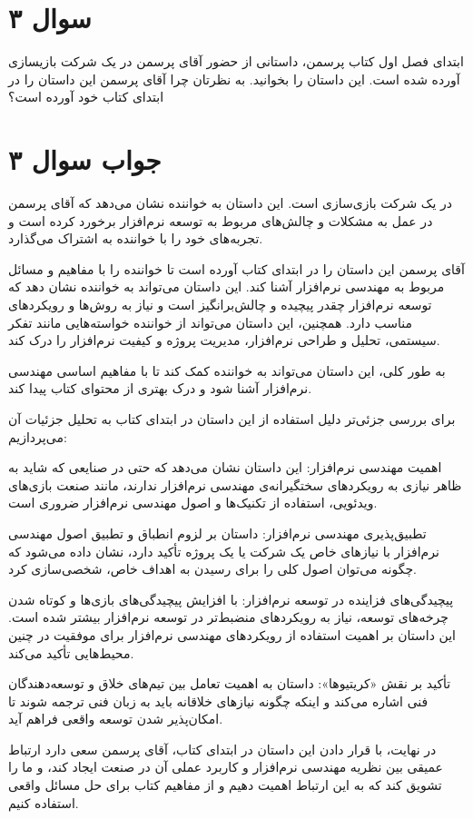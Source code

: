 \section*{سوال ۳}

ابتدای فصل اول کتاب پرسمن، داستانی از حضور آقای پرسمن در یک شرکت بازیسازی آورده شده است. این داستان را بخوانید. به نظرتان چرا آقای پرسمن این داستان را در ابتدای کتاب خود آورده است؟

\section*{جواب سوال ۳}

در یک شرکت بازی‌سازی است. این داستان به خواننده نشان می‌دهد که آقای پرسمن در عمل به مشکلات و چالش‌های مربوط به توسعه نرم‌افزار برخورد کرده است و تجربه‌های خود را با خواننده به اشتراک می‌گذارد.

آقای پرسمن این داستان را در ابتدای کتاب آورده است تا خواننده را با مفاهیم و مسائل مربوط به مهندسی نرم‌افزار آشنا کند. این داستان می‌تواند به خواننده نشان دهد که توسعه نرم‌افزار چقدر پیچیده و چالش‌برانگیز است و نیاز به روش‌ها و رویکردهای مناسب دارد. همچنین، این داستان می‌تواند از خواننده خواسته‌هایی مانند تفکر سیستمی، تحلیل و طراحی نرم‌افزار، مدیریت پروژه و کیفیت نرم‌افزار را درک کند.

به طور کلی، این داستان می‌تواند به خواننده کمک کند تا با مفاهیم اساسی مهندسی نرم‌افزار آشنا شود و درک بهتری از محتوای کتاب پیدا کند.

برای بررسی جزئی‌تر دلیل استفاده از این داستان در ابتدای کتاب به تحلیل جزئیات آن می‌پردازیم:

اهمیت مهندسی نرم‌افزار: این داستان نشان می‌دهد که حتی در صنایعی که شاید به ظاهر نیازی به رویکردهای سختگیرانه‌ی مهندسی نرم‌افزار ندارند، مانند صنعت بازی‌های ویدئویی، استفاده از تکنیک‌ها و اصول مهندسی نرم‌افزار ضروری است.

تطبیق‌پذیری مهندسی نرم‌افزار: داستان بر لزوم انطباق و تطبیق اصول مهندسی نرم‌افزار با نیازهای خاص یک شرکت یا یک پروژه تأکید دارد، نشان داده می‌شود که چگونه می‌توان اصول کلی را برای رسیدن به اهداف خاص، شخصی‌سازی کرد.

پیچیدگی‌های فزاینده در توسعه نرم‌افزار: با افزایش پیچیدگی‌های بازی‌ها و کوتاه‌ شدن چرخه‌های توسعه، نیاز به رویکردهای منضبط‌تر در توسعه نرم‌افزار بیشتر شده است. این داستان بر اهمیت استفاده از رویکردهای مهندسی نرم‌افزار برای موفقیت در چنین محیط‌هایی تأکید می‌کند.

تأکید بر نقش «کریتیوها»: داستان به اهمیت تعامل بین تیم‌های خلاق و توسعه‌دهندگان فنی اشاره می‌کند و اینکه چگونه نیازهای خلاقانه باید به زبان فنی ترجمه شوند تا امکان‌پذیر شدن توسعه واقعی فراهم آید.

در نهایت، با قرار دادن این داستان در ابتدای کتاب، آقای پرسمن سعی دارد ارتباط عمیقی بین نظریه مهندسی نرم‌افزار و کاربرد عملی آن در صنعت ایجاد کند، و ما را تشویق کند که به این ارتباط اهمیت دهیم و از مفاهیم کتاب برای حل مسائل واقعی استفاده کنیم.
